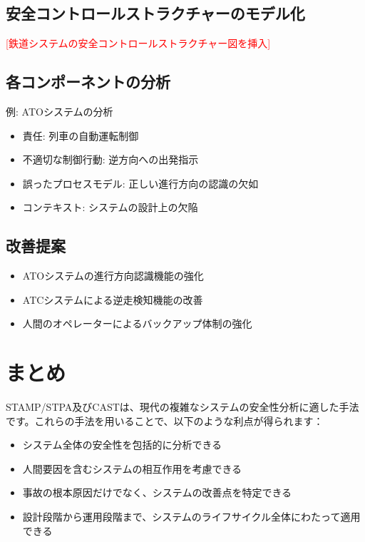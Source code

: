 \subsection{安全コントロールストラクチャーのモデル化}

\textcolor{red}{[鉄道システムの安全コントロールストラクチャー図を挿入]}

\subsection{各コンポーネントの分析}

例: ATOシステムの分析
\begin{itemize}
    \item 責任: 列車の自動運転制御
    \item 不適切な制御行動: 逆方向への出発指示
    \item 誤ったプロセスモデル: 正しい進行方向の認識の欠如
    \item コンテキスト: システムの設計上の欠陥
\end{itemize}

\subsection{改善提案}

\begin{itemize}
    \item ATOシステムの進行方向認識機能の強化
    \item ATCシステムによる逆走検知機能の改善
    \item 人間のオペレーターによるバックアップ体制の強化
\end{itemize}

\section{まとめ}

STAMP/STPA及びCASTは、現代の複雑なシステムの安全性分析に適した手法です。これらの手法を用いることで、以下のような利点が得られます：

\begin{itemize}
    \item システム全体の安全性を包括的に分析できる
    \item 人間要因を含むシステムの相互作用を考慮できる
    \item 事故の根本原因だけでなく、システムの改善点を特定できる
    \item 設計段階から運用段階まで、システムのライフサイクル全体にわたって適用できる
\end{itemize}

